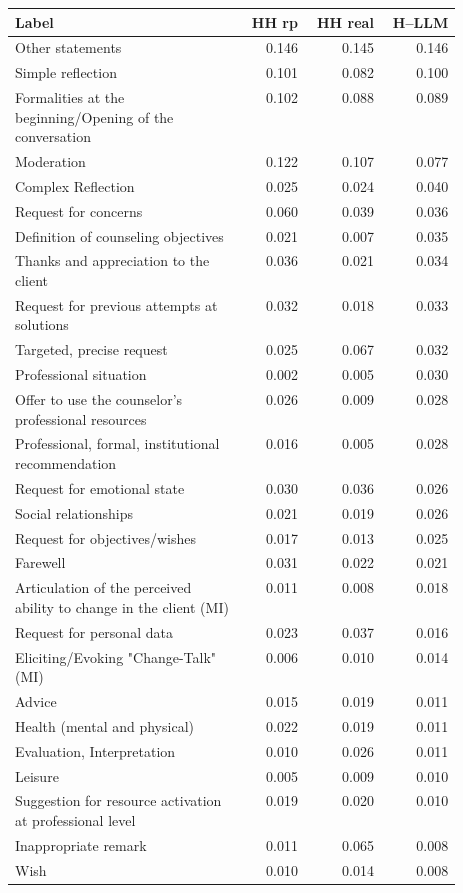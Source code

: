 \begin{tabular}{p{0.52\linewidth}rrr}
\toprule
Label & HH rp & HH real & H--LLM \\
\midrule
Other statements & 0.146 & 0.145 & 0.146 \\
Simple reflection & 0.101 & 0.082 & 0.100 \\
Formalities at the beginning/Opening of the conversation & 0.102 & 0.088 & 0.089 \\
Moderation & 0.122 & 0.107 & 0.077 \\
Complex Reflection & 0.025 & 0.024 & 0.040 \\
Request for concerns & 0.060 & 0.039 & 0.036 \\
Definition of counseling objectives & 0.021 & 0.007 & 0.035 \\
Thanks and appreciation to the client & 0.036 & 0.021 & 0.034 \\
Request for previous attempts at solutions & 0.032 & 0.018 & 0.033 \\
Targeted, precise request & 0.025 & 0.067 & 0.032 \\
Professional situation & 0.002 & 0.005 & 0.030 \\
Offer to use the counselor’s professional resources & 0.026 & 0.009 & 0.028 \\
Professional, formal, institutional recommendation & 0.016 & 0.005 & 0.028 \\
Request for emotional state & 0.030 & 0.036 & 0.026 \\
Social relationships & 0.021 & 0.019 & 0.026 \\
Request for objectives/wishes & 0.017 & 0.013 & 0.025 \\
Farewell & 0.031 & 0.022 & 0.021 \\
Articulation of the perceived ability to change in the client (MI) & 0.011 & 0.008 & 0.018 \\
Request for personal data & 0.023 & 0.037 & 0.016 \\
Eliciting/Evoking "Change-Talk" (MI) & 0.006 & 0.010 & 0.014 \\
Advice & 0.015 & 0.019 & 0.011 \\
Health (mental and physical) & 0.022 & 0.019 & 0.011 \\
Evaluation, Interpretation & 0.010 & 0.026 & 0.011 \\
Leisure & 0.005 & 0.009 & 0.010 \\
Suggestion for resource activation at professional level & 0.019 & 0.020 & 0.010 \\
Inappropriate remark & 0.011 & 0.065 & 0.008 \\
Wish & 0.010 & 0.014 & 0.008 \\
\bottomrule
\end{tabular}
